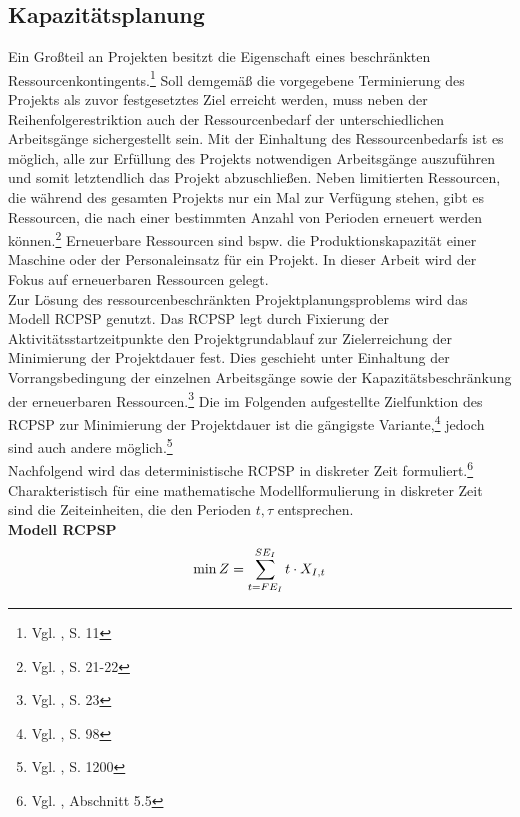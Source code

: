 \documentclass[a4paper,12pt,parskip,bibtotoc,liststotoc]{article}
\begin{document}
\subsection{Kapazitätsplanung}
Ein Großteil an Projekten besitzt die Eigenschaft eines beschränkten Ressourcenkontingents.\footnote{Vgl. \cite{kellenbrink2014einfuhrung}, S. 11} Soll demgemäß die vorgegebene Terminierung des Projekts als zuvor festgesetztes Ziel erreicht werden, muss neben der Reihenfolgerestriktion auch der Ressourcenbedarf der unterschiedlichen Arbeitsgänge sichergestellt sein. Mit der Einhaltung des Ressourcenbedarfs ist es möglich, alle zur Erfüllung des Projekts notwendigen Arbeitsgänge auszuführen und somit letztendlich das Projekt abzuschließen. Neben limitierten Ressourcen, die während des gesamten Projekts nur ein Mal zur Verfügung stehen, gibt es Ressourcen, die nach einer bestimmten Anzahl von Perioden erneuert werden können.\footnote{Vgl. \cite{neumann2003project}, S. 21-22} Erneuerbare Ressourcen sind bspw. die Produktionskapazität einer Maschine oder der Personaleinsatz für ein Projekt. In dieser Arbeit wird der Fokus auf erneuerbaren Ressourcen gelegt.\\

Zur Lösung des ressourcenbeschränkten Projektplanungsproblems wird das Modell RCPSP genutzt. Das RCPSP legt durch Fixierung der Aktivitätsstartzeitpunkte den Projektgrundablauf zur Zielerreichung der Minimierung der Projektdauer fest. Dies geschieht unter Einhaltung der Vorrangsbedingung der einzelnen Arbeitsgänge sowie der Kapazitätsbeschränkung der erneuerbaren Ressourcen.\footnote{Vgl. \cite{demeulemeester2011robust}, S. 23} Die im Folgenden aufgestellte Zielfunktion des RCPSP zur Minimierung der Projektdauer ist die gängigste Variante,\footnote{Vgl. \cite{drexl1997neuere}, S. 98} jedoch sind auch andere möglich.\footnote{Vgl. \cite{talbot1982resource}, S. 1200}\\

Nachfolgend wird das deterministische RCPSP in diskreter Zeit formuliert.\footnote{Vgl. \cite{domschke2005einfuhrung}, Abschnitt 5.5} Charakteristisch für eine mathematische Modellformulierung in diskreter Zeit sind die Zeiteinheiten, die den Perioden $t, \tau$ entsprechen.\\

\textbf{Modell RCPSP}
\begin{eqnarray} \label{Ziel}
\min Z = \sum_{t=FE_{I}}^{SE_{I}}t \cdot X_{I,t}\hfill  
\end{eqnarray}
\end{document}
